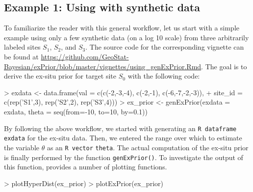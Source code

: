\subsection{Example 1: Using  with synthetic data}\label{ssec:quick-example}

To familiarize the reader with this general workflow, let us start with a simple example using only a few synthetic data (on a log 10 scale) from three arbitrarily labeled sites $S_1$, $S_2$, and $S_3$.
The source code for the corresponding vignette can be found at \url{https://github.com/GeoStat-Bayesian/exPrior/blob/master/vignettes/using_genExPrior.Rmd}. 
The goal is to derive the ex-situ prior for target site $S_0$ with the following code:

\begin{example}
> exdata <- data.frame(val = c(c(-2,-3,-4), c(-2,-1), c(-6,-7,-2,-3)), 
+                      site_id = c(rep('S1',3), rep('S2',2), rep('S3',4))) 
> ex_prior <- genExPrior(exdata = exdata, theta = seq(from=-10, to=10, by=0.1)) 
\end{example}

By following the above workflow, we started with generating an \texttt{R dataframe} \texttt{exdata} for the ex-situ data. 
Then, we entered the range over which to estimate the variable $\theta$ as an \texttt{R vector} \texttt{theta}. 
The actual computation of the ex-situ prior is finally performed by the function \texttt{genExPrior()}. 
To investigate the output of this function,  provides a number of plotting functions.




\begin{example}
> plotHyperDist(ex_prior) 
> plotExPrior(ex_prior) 
\end{example}

